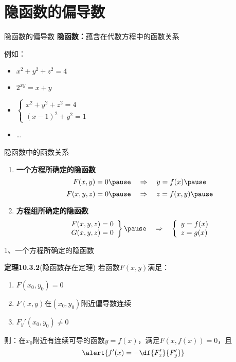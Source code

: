 \section{隐函数的偏导数}

\begin{frame}{隐函数的偏导数}
	\linespread{1.2}
	{\b {\bf 隐函数：}蕴含在代数方程中的函数关系}\pause 
	
	例如：
	\begin{itemize}
	  \item $x^2+y^2+z^2=4$\pause 
	  \item $2^{xy}=x+y$\pause 
	  \item $\left\{\begin{array}{l}
	  	x^2+y^2+z^2=4\\
	  	(x-1)^2+y^2=1
	  \end{array}\right.$\pause 
	  \item \ldots
	\end{itemize}
	
\end{frame}

\begin{frame}{隐函数中的函数关系}
	\linespread{1.2}\pause 
	\begin{enumerate}
	  \item {\bf 一个方程所确定的隐函数}\pause 
	  $$F(x,y)=0\pause \quad \Rightarrow \quad y=f(x)\pause $$
	  $$F(x,y,z)=0\pause \quad \Rightarrow \quad z=f(x,y)\pause $$
	  \item {\bf 方程组所确定的隐函数}\pause 
	  $$\left.\begin{array}{l}
	  	F(x,y,z)=0\\ G(x,y,z)=0
	  \end{array}\right\}\pause \quad \Rightarrow \quad 
	  \left\{\begin{array}{l}
	  	y=f(x)\\ z=g(x)
	  \end{array}\right. $$
	\end{enumerate}
\end{frame}

\begin{frame}{1、一个方程所确定的隐函数}
	\linespread{1.2}\pause 
	\begin{block}{{\bf 定理10.3.2}(隐函数存在定理)\hfill}
		若函数$F(x,y)$满足：\pause 
		\begin{enumerate}
		  \item $F(x_0,y_0)=0$\pause 
		  \item $F(x,y)$在$(x_0,y_0)$附近偏导数连续\pause 
		  \item $F_y'(x_0,y_0)\ne 0$\pause 
		\end{enumerate}
		则：在$x_0$附近有连续可导的函数$y=f(x)$，\pause 满足$F(x,f(x))=0$，\pause 且
		  $$\alert{f'(x)=-\df{F'_x}{F'_y}}$$
	\end{block}
\end{frame}

